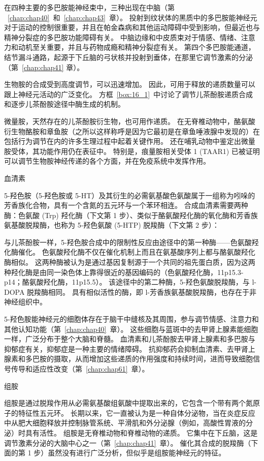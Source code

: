 在四种主要的多巴胺能神经束中，三种出现在中脑（第 ~\ref{chap:chap40}~和~\ref{chap:chap43}~章）。
投射到纹状体的黑质中的多巴胺能神经元对于运动的控制很重要，并且在帕金森病和其他运动障碍中受到影响，但最近也与精神分裂症的多巴胺功能障碍有关。
中脑边缘和中皮质束对于情感、情绪、注意力和动机至关重要，并且与药物成瘾和精神分裂症有关。
第四个多巴胺能通道，结节漏斗通路，起源于下丘脑的弓状核并投射到垂体，在那里它调节激素的分泌（第~\ref{chap:chap41} 章）。


生物胺的合成受到高度调节，可以迅速增加。
因此，可用于释放的递质数量可以跟上神经元活动的广泛变化。
方框~\ref{box:16_1}~中讨论了调节儿茶酚胺递质合成和逐步儿茶酚胺途径中酶生成的机制。


微量胺，天然存在的儿茶酚胺衍生物，也可用作递质。
在无脊椎动物中，酪氨酸衍生物酪胺和章鱼胺（之所以这样称呼是因为它最初是在章鱼唾液腺中发现的）在包括行为调节在内的许多生理过程中起着关键作用。
还在哺乳动物中鉴定出微量胺受体，其功能作用仍在表征中。
特别是，痕量胺相关受体 1 (TAAR1) 已被证明可以调节生物胺神经传递的各个方面，并在免疫系统中发挥作用。


血清素

5-羟色胺（5-羟色胺或 5-HT）及其衍生的必需氨基酸色氨酸属于一组称为吲哚的芳香族化合物，具有一个含氮的五元环与一个苯环相连。
合成血清素需要两种酶：色氨酸 (Trp) 羟化酶（下文第 1 步）、类似于酪氨酸羟化酶的氧化酶和芳香族氨基酸脱羧酶，也称为 5-羟色氨酸 (5-HTP) 脱羧酶（下文第 2 步）：


与儿茶酚胺一样，5-羟色胺合成中的限制性反应由途径中的第一种酶——色氨酸羟化酶催化。
色氨酸羟化酶不仅在催化机制上而且在氨基酸序列上都与酪氨酸羟化酶相似。
这两种酶被认为是通过基因复制源于一个共同的祖先蛋白质，因为这两种羟化酶是由同一染色体上靠得很近的基因编码的（色氨酸羟化酶，11p15.3-p14；酪氨酸羟化酶，11p15.5）。
该途径中的第二种酶，5-羟色氨酸脱羧酶，与 l-DOPA 脱羧酶相同。
具有相似活性的酶，即 l-芳香族氨基酸脱羧酶，也存在于非神经组织中。


5-羟色胺能神经元的细胞体存在于脑干中缝核及其周围，参与调节情感、注意力和其他认知功能（第~\ref{chap:chap40}~章）。
这些细胞与蓝斑中的去甲肾上腺素能细胞一样，广泛分布于整个大脑和脊髓。
血清素和儿茶酚胺去甲肾上腺素和多巴胺与抑郁症有关，抑郁症是一种主要的情绪障碍。
抗抑郁药会抑制血清素、去甲肾上腺素和多巴胺的摄取，从而增加这些递质的作用强度和持续时间，进而导致细胞信号传导和适应性改变（第~\ref{chap:chap61}~章）。


组胺

组胺是通过脱羧作用从必需氨基酸组氨酸中提取出来的，它包含一个带有两个氮原子的特征性五元环。
长期以来，它一直被认为是一种自体分泌物，当在炎症反应中从肥大细胞释放并控制脉管系统、平滑肌和外分泌腺（例如，高酸性胃液的分泌）时具有活性。
组胺是无脊椎动物和脊椎动物的递质。 它集中在下丘脑，这是调节激素分泌的大脑中心之一（第~\ref{chap:chap41}~章）。
催化其合成的脱羧酶（下面的第 1 步）虽然没有进行广泛分析，但似乎是组胺能神经元的特征。


